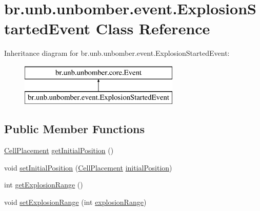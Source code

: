 \hypertarget{classbr_1_1unb_1_1unbomber_1_1event_1_1_explosion_started_event}{\section{br.\+unb.\+unbomber.\+event.\+Explosion\+Started\+Event Class Reference}
\label{classbr_1_1unb_1_1unbomber_1_1event_1_1_explosion_started_event}
}
Inheritance diagram for br.\+unb.\+unbomber.\+event.\+Explosion\+Started\+Event\+:\begin{figure}[H]
\begin{center}
\leavevmode
\includegraphics[height=2.000000cm]{classbr_1_1unb_1_1unbomber_1_1event_1_1_explosion_started_event}
\end{center}
\end{figure}
\subsection*{Public Member Functions}
\begin{DoxyCompactItemize}
\item 
\hyperlink{classbr_1_1unb_1_1unbomber_1_1component_1_1_cell_placement}{Cell\+Placement} \hyperlink{classbr_1_1unb_1_1unbomber_1_1event_1_1_explosion_started_event_aeddf468a425883db4059c2ec3465df92}{get\+Initial\+Position} ()
\item 
void \hyperlink{classbr_1_1unb_1_1unbomber_1_1event_1_1_explosion_started_event_a5295841da7cbb68ae6e8811d0f58d1a5}{set\+Initial\+Position} (\hyperlink{classbr_1_1unb_1_1unbomber_1_1component_1_1_cell_placement}{Cell\+Placement} \hyperlink{classbr_1_1unb_1_1unbomber_1_1event_1_1_explosion_started_event_abfef22edb8b12f9a74b7de602026a513}{initial\+Position})
\item 
int \hyperlink{classbr_1_1unb_1_1unbomber_1_1event_1_1_explosion_started_event_af786391f95517983c5127ce303b378b7}{get\+Explosion\+Range} ()
\item 
void \hyperlink{classbr_1_1unb_1_1unbomber_1_1event_1_1_explosion_started_event_a9c43ad0a33e6ad949f1b31437e6662f2}{set\+Explosion\+Range} (int \hyperlink{classbr_1_1unb_1_1unbomber_1_1event_1_1_explosion_started_event_a49b514669cac258aa4fbf1d8f5147c9e}{explosion\+Range})
\end{DoxyCompactItemize}
